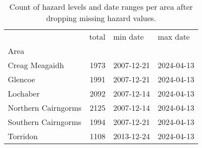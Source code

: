 \begin{table}[h]
\caption{Count of hazard levels and date ranges per area after dropping missing hazard values.}
\label{tbl:sais_area_breakdown}
\begin{tabular}{lrll}
\toprule
 & total & min date & max date \\
Area &  &  &  \\
\midrule
Creag Meagaidh & 1973 & 2007-12-21 & 2024-04-13 \\
Glencoe & 1991 & 2007-12-21 & 2024-04-13 \\
Lochaber & 2092 & 2007-12-14 & 2024-04-13 \\
Northern Cairngorms & 2125 & 2007-12-14 & 2024-04-13 \\
Southern Cairngorms & 1994 & 2007-12-21 & 2024-04-13 \\
Torridon & 1108 & 2013-12-24 & 2024-04-13 \\
\bottomrule
\end{tabular}
\end{table}
